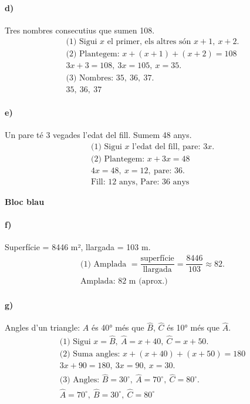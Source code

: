 \documentclass[11pt,a4paper]{article}
\begin{document}
\paragraph{d)} Tres nombres consecutius que sumen 108.
\[
\begin{aligned}
\text{(1) Sigui } x \text{ el primer, els altres són } x+1,\ x+2. \\
\text{(2) Plantegem: } x + (x+1) + (x+2) = 108 \\
3x + 3 = 108,\ 3x = 105,\ x = 35. \\
\text{(3) Nombres: } 35,\ 36,\ 37. \\
\boxed{35,\ 36,\ 37}
\end{aligned}
\]

\paragraph{e)} Un pare té 3 vegades l’edat del fill. Sumem 48 anys.
\[
\begin{aligned}
\text{(1) Sigui } x \text{ l’edat del fill, pare: } 3x. \\
\text{(2) Plantegem: } x + 3x = 48 \\
4x = 48,\ x = 12,\ \text{pare: } 36. \\
\boxed{\text{Fill: 12 anys, Pare: 36 anys}}
\end{aligned}
\]

\textbf{Bloc blau}

\paragraph{f)} Superfície = 8446 m², llargada = 103 m.
\[
\begin{aligned}
\text{(1) Amplada } = \dfrac{\text{superfície}}{\text{llargada}} = \dfrac{8446}{103} \approx 82. \\
\boxed{\text{Amplada: 82 m (aprox.)}}
\end{aligned}
\]

\paragraph{g)} Angles d’un triangle: $\hat{A}$ és 40° més que $\hat{B}$, $\hat{C}$ és 10° més que $\hat{A}$.
\[
\begin{aligned}
\text{(1) Sigui } x = \hat{B},\ \hat{A} = x + 40,\ \hat{C} = x + 50. \\
\text{(2) Suma angles: } x + (x+40) + (x+50) = 180 \\
3x + 90 = 180,\ 3x = 90,\ x = 30. \\
\text{(3) Angles: } \hat{B}=30^\circ,\ \hat{A}=70^\circ,\ \hat{C}=80^\circ. \\
\boxed{\hat{A}=70^\circ,\ \hat{B}=30^\circ,\ \hat{C}=80^\circ}
\end{aligned}
\]
\end{document}
